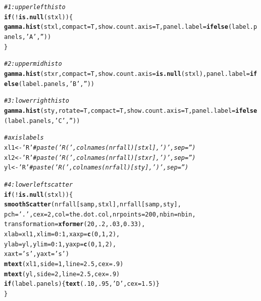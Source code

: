 \documentclass{article}\usepackage[]{graphicx}\usepackage[]{color}
\makeatletter
\newcommand{\hlnum}[1]{\textcolor[rgb]{0.686,0.059,0.569}{#1}}%
\newcommand{\hlstr}[1]{\textcolor[rgb]{0.192,0.494,0.8}{#1}}%
\newcommand{\hlcom}[1]{\textcolor[rgb]{0.678,0.584,0.686}{\textit{#1}}}%
\newcommand{\hlopt}[1]{\textcolor[rgb]{0,0,0}{#1}}%
\newcommand{\hlstd}[1]{\textcolor[rgb]{0.345,0.345,0.345}{#1}}%
\newcommand{\hlkwa}[1]{\textcolor[rgb]{0.161,0.373,0.58}{\textbf{#1}}}%
\newcommand{\hlkwb}[1]{\textcolor[rgb]{0.69,0.353,0.396}{#1}}%
\newcommand{\hlkwc}[1]{\textcolor[rgb]{0.333,0.667,0.333}{#1}}%
\newcommand{\hlkwd}[1]{\textcolor[rgb]{0.737,0.353,0.396}{\textbf{#1}}}%
\newenvironment{kframe}{%
 \def\at@end@of@kframe{}%
 \ifinner\ifhmode%
  \def\at@end@of@kframe{\end{minipage}}%
  \begin{minipage}{\columnwidth}%
 \fi\fi%
 \def\FrameCommand##1{\hskip\@totalleftmargin \hskip-\fboxsep
 \colorbox{shadecolor}{##1}\hskip-\fboxsep
     \hskip-\linewidth \hskip-\@totalleftmargin \hskip\columnwidth}%
 \MakeFramed {\advance\hsize-\width
   \@totalleftmargin\z@ \linewidth\hsize
   \@setminipage}}%
 {\par\unskip\endMakeFramed%
 \at@end@of@kframe}
\newenvironment{knitrout}{}{} %
\makeatother
\begin{document}
\begin{knitrout}
\begin{kframe}
\begin{alltt}
  \hlcom{# 1: upper left histo}
  \hlkwa{if}\hlstd{(}\hlopt{!}\hlkwd{is.null}\hlstd{(stxl))\{}
    \hlkwd{gamma.hist}\hlstd{(stxl,}\hlkwc{compact}\hlstd{=T,} \hlkwc{show.count.axis}\hlstd{=T,} \hlkwc{panel.label}\hlstd{=}\hlkwd{ifelse}\hlstd{(label.panels,}\hlstr{'A'}\hlstd{,}\hlstr{''}\hlstd{))}
  \hlstd{\}}

  \hlcom{# 2: upper mid histo}
  \hlkwd{gamma.hist}\hlstd{(stxr,}\hlkwc{compact}\hlstd{=T,} \hlkwc{show.count.axis}\hlstd{=}\hlkwd{is.null}\hlstd{(stxl),} \hlkwc{panel.label}\hlstd{=}\hlkwd{ifelse}\hlstd{(label.panels,}\hlstr{'B'}\hlstd{,}\hlstr{''}\hlstd{))}

  \hlcom{# 3: lower right histo}
  \hlkwd{gamma.hist}\hlstd{(sty,}\hlkwc{rotate}\hlstd{=T,}\hlkwc{compact}\hlstd{=T,} \hlkwc{show.count.axis}\hlstd{=T,} \hlkwc{panel.label}\hlstd{=}\hlkwd{ifelse}\hlstd{(label.panels,}\hlstr{'C'}\hlstd{,}\hlstr{''}\hlstd{))}

  \hlcom{# axis labels}
  \hlstd{xl1} \hlkwb{<-} \hlstr{'R'} \hlcom{# paste('R (',colnames(nrfall)[stxl], ')',sep='') }
  \hlstd{xl2} \hlkwb{<-} \hlstr{'R'} \hlcom{# paste('R (',colnames(nrfall)[stxr], ')',sep='') }
  \hlstd{yl}  \hlkwb{<-} \hlstr{'R'} \hlcom{# paste('R (',colnames(nrfall)[sty],  ')',sep='') }

  \hlcom{# 4: lower left scatter}
  \hlkwa{if}\hlstd{(}\hlopt{!}\hlkwd{is.null}\hlstd{(stxl))\{}
    \hlkwd{smoothScatter}\hlstd{(nrfall[samp,stxl], nrfall[samp,sty],}
                  \hlkwc{pch}\hlstd{=}\hlstr{'.'}\hlstd{,} \hlkwc{cex}\hlstd{=}\hlnum{2}\hlstd{,} \hlkwc{col}\hlstd{=the.dot.col,} \hlkwc{nrpoints}\hlstd{=}\hlnum{200}\hlstd{,} \hlkwc{nbin}\hlstd{=nbin,}
                  \hlkwc{transformation}\hlstd{=}\hlkwd{xformer}\hlstd{(}\hlnum{20}\hlstd{,}\hlnum{.2}\hlstd{,}\hlnum{.03}\hlstd{,}\hlnum{0.33}\hlstd{),}
                  \hlkwc{xlab}\hlstd{=xl1,} \hlkwc{xlim}\hlstd{=}\hlnum{0}\hlopt{:}\hlnum{1}\hlstd{,} \hlkwc{xaxp}\hlstd{=}\hlkwd{c}\hlstd{(}\hlnum{0}\hlstd{,}\hlnum{1}\hlstd{,}\hlnum{2}\hlstd{),}
                  \hlkwc{ylab}\hlstd{=yl,}  \hlkwc{ylim}\hlstd{=}\hlnum{0}\hlopt{:}\hlnum{1}\hlstd{,} \hlkwc{yaxp}\hlstd{=}\hlkwd{c}\hlstd{(}\hlnum{0}\hlstd{,}\hlnum{1}\hlstd{,}\hlnum{2}\hlstd{),}
                  \hlkwc{xaxt}\hlstd{=}\hlstr{'s'}\hlstd{,} \hlkwc{yaxt}\hlstd{=}\hlstr{'s'}\hlstd{)}
    \hlkwd{mtext}\hlstd{(xl1,}\hlkwc{side}\hlstd{=}\hlnum{1}\hlstd{,} \hlkwc{line}\hlstd{=}\hlnum{2.5}\hlstd{,} \hlkwc{cex}\hlstd{=}\hlnum{.9}\hlstd{)}
    \hlkwd{mtext}\hlstd{(yl,} \hlkwc{side}\hlstd{=}\hlnum{2}\hlstd{,} \hlkwc{line}\hlstd{=}\hlnum{2.5}\hlstd{,} \hlkwc{cex}\hlstd{=}\hlnum{.9}\hlstd{)}
    \hlkwa{if}\hlstd{(label.panels)\{}\hlkwd{text}\hlstd{(}\hlnum{.10}\hlstd{,} \hlnum{.95}\hlstd{,} \hlstr{'D'}\hlstd{,} \hlkwc{cex}\hlstd{=}\hlnum{1.5}\hlstd{)\}}
  \hlstd{\}}


\end{alltt}
\end{kframe}
\end{knitrout}
\end{document}

